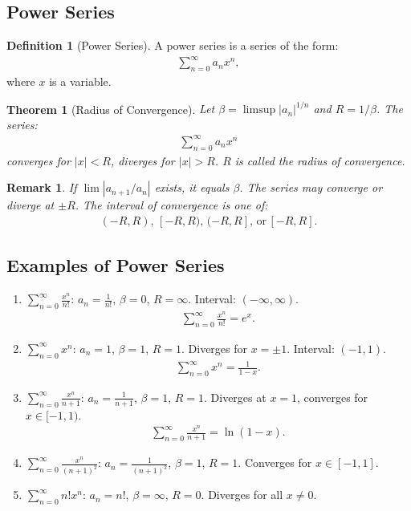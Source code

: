 \documentclass[9pt]{article}
\theoremstyle{definition}
\newtheorem{definition}{Definition}
\theoremstyle{plain}
\newtheorem{theorem}{Theorem}
\newtheorem{remark}{Remark}
\begin{document}
\subsection*{Power Series}
\begin{definition}[Power Series]
A power series is a series of the form:
\begin{align}
\sum_{n=0}^\infty a_n x^n,
\end{align}
where $ x $ is a variable.
\end{definition}

\begin{theorem}[Radius of Convergence]
Let $ \beta = \limsup |a_n|^{1/n} $ and $ R = 1/\beta $. The series:
\begin{align}
\sum_{n=0}^\infty a_n x^n
\end{align}
converges for $ |x| < R $, diverges for $ |x| > R $. $ R $ is called the radius of convergence.
\end{theorem}

\begin{remark}
If $ \lim |a_{n+1}/a_n| $ exists, it equals $ \beta $. The series may converge or diverge at $ \pm R $. The interval of convergence is one of:
\begin{align}
(-R, R), \, [-R, R), \, (-R, R], \, \text{or} \, [-R, R].
\end{align}
\end{remark}

\subsection*{Examples of Power Series}
\begin{enumerate}
    \item $ \sum_{n=0}^\infty \frac{x^n}{n!} $: $ a_n = \frac{1}{n!} $, $ \beta = 0 $, $ R = \infty $. Interval: $ (-\infty, \infty) $.
    \begin{align}
    \sum_{n=0}^\infty \frac{x^n}{n!} = e^x.
    \end{align}
    \item $ \sum_{n=0}^\infty x^n $: $ a_n = 1 $, $ \beta = 1 $, $ R = 1 $. Diverges for $ x = \pm 1 $. Interval: $ (-1, 1) $.
    \begin{align}
    \sum_{n=0}^\infty x^n = \frac{1}{1-x}.
    \end{align}
    \item $ \sum_{n=0}^\infty \frac{x^n}{n+1} $: $ a_n = \frac{1}{n+1} $, $ \beta = 1 $, $ R = 1 $. Diverges at $ x = 1 $, converges for $ x \in [-1, 1) $.
    \begin{align}
    \sum_{n=0}^\infty \frac{x^n}{n+1} = \ln(1-x).
    \end{align}
    \item $ \sum_{n=0}^\infty \frac{x^n}{(n+1)^2} $: $ a_n = \frac{1}{(n+1)^2} $, $ \beta = 1 $, $ R = 1 $. Converges for $ x \in [-1, 1] $.
    \item $ \sum_{n=0}^\infty n! x^n $: $ a_n = n! $, $ \beta = \infty $, $ R = 0 $. Diverges for all $ x \neq 0 $.
\end{enumerate}
\end{document}
